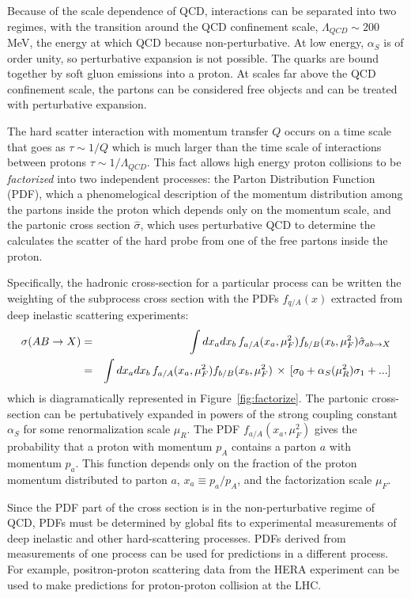 Because of the scale dependence of QCD, interactions can be separated into two regimes, with the transition around the QCD confinement scale, $\Lambda_{QCD} \sim 200$ MeV, the energy at which QCD because non-perturbative. At low energy, $\alpha_S$ is of order unity, so perturbative expansion is not possible. The quarks are bound together by soft gluon emissions into a proton. At scales far above the QCD confinement scale, the partons can be considered free objects and can be treated with perturbative expansion.

The hard scatter interaction with momentum transfer $Q$ occurs on a time scale that goes as $\tau \sim 1/Q$ which is much larger than the time scale of interactions between protons $\tau \sim 1/\Lambda_{QCD}$. This fact allows high energy proton collisions to be \textit{factorized} into two independent processes: the Parton Distribution Function (PDF), which a phenomelogical description of the momentum distribution among the partons inside the proton which depends only on the momentum scale, and the partonic cross section $\hat{\sigma}$, which uses perturbative QCD to determine the calculates the scatter of the hard probe from one of the free partons inside the proton.


Specifically, the hadronic cross-section for a particular process can be written the weighting of the subprocess cross section with the PDFs $f_{q/A}(x)$ extracted from deep inelastic scattering experiments\cite{Campbell:2006wx}:
\begin{eqnarray}
\sigma(AB\rightarrow X) &=& \int dx_a dx_b \,f_{a/A}(x_a,\mu_F^2) f_{b/B}(x_b,\mu_F^2) \hat{\sigma}_{ab \rightarrow X} \nonumber \\
&=& \int dx_a dx_b \,f_{a/A}(x_a,\mu_F^2) f_{b/B}(x_b,\mu_F^2) \,\times\,[\sigma_0 + \alpha_{S}(\mu_R^2)\sigma_1 + ...]
\end{eqnarray}
which is diagramatically represented in Figure~\ref{fig:factorize}. The partonic cross-section can be pertubatively expanded in powers of the strong coupling constant $\alpha_S$ for some renormalization scale $\mu_R$. The PDF $f_{a/A}(x_a,\mu_F^2)$ gives the probability that a proton with momentum $p_A$ contains a parton $a$ with momentum $p_a$. This function depends only on the fraction of the proton momentum distributed to parton $a$, $x_a \equiv p_a/p_A$, and the factorization scale $\mu_F$. 

Since the PDF part of the cross section is in the non-perturbative regime of QCD, PDFs must be determined by global fits to experimental measurements of deep inelastic and other hard-scattering processes. PDFs derived from measurements of one process can be used for predictions in a different process. For example, positron-proton scattering data from the HERA experiment can be used to make predictions for proton-proton collision at the LHC. 

